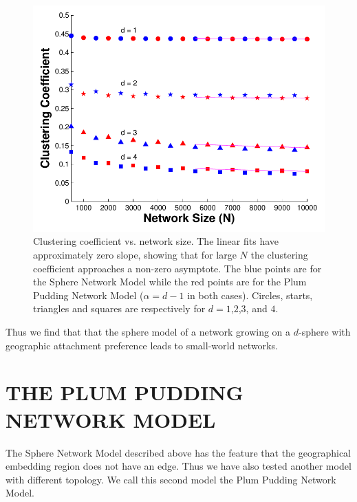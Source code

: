 \documentclass[aps,pre,reprint,superscriptaddress,amsmath,amssymb,nofootinbib]{revtex4-1}
\begin{document}
\begin{itemize}
\begin{figure}
\includegraphics[width=\linewidth]{figures/figCvsN.pdf}
\caption{\label{clustN}Clustering coefficient vs. network size. The linear fits have approximately zero slope, showing that for large $N$ the clustering coefficient approaches a non-zero asymptote. The blue points are for the Sphere Network Model while the red points are for the Plum Pudding Network Model ($\alpha = d-1$ in both cases). Circles, starts, triangles and squares are respectively for $d = 1$,$2$,$3$, and $4$.}
\end{figure}

\end{itemize}
Thus we find that that the sphere model of a network growing on a $d$-sphere with geographic attachment preference leads to small-world networks.

\section{THE PLUM PUDDING NETWORK MODEL}
The Sphere Network Model described above has the feature that the geographical embedding region does not have an edge.
Thus we have also tested another model with different topology.
We call this second model the Plum Pudding Network Model.
\end{document}
